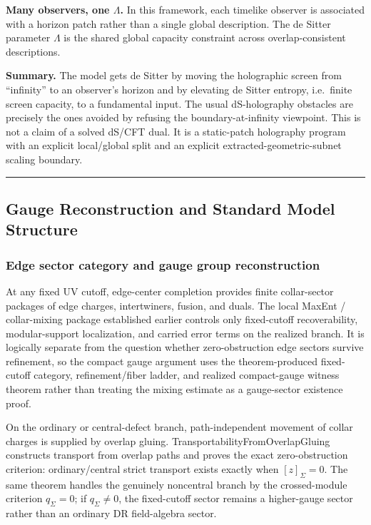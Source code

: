\textbf{Many observers, one \(\Lambda\).} In this framework, each timelike observer is associated with a horizon patch rather than a single global description. The de Sitter parameter \(\Lambda\) is the shared global capacity constraint across overlap-consistent descriptions.

\textbf{Summary.} The model gets de Sitter by moving the holographic screen from ``infinity'' to an observer's horizon and by elevating de Sitter entropy, i.e.\ finite screen capacity, to a fundamental input. The usual dS-holography obstacles are precisely the ones avoided by refusing the boundary-at-infinity viewpoint. This is not a claim of a solved dS/CFT dual. It is a static-patch holography program with an explicit local/global split and an explicit extracted-geometric-subnet scaling boundary.

\begin{center}\rule{0.5\linewidth}{0.5pt}\end{center}
\subsection{Gauge Reconstruction and Standard Model Structure}\label{6-gauge-reconstruction-and-standard-model-structure}

\subsubsection{Edge sector category and gauge group reconstruction}\label{61-edge-sector-category-and-gauge-group-reconstruction}

At any fixed UV cutoff, edge-center completion provides finite collar-sector packages of edge charges, intertwiners, fusion, and duals. The local MaxEnt / collar-mixing package established earlier controls only fixed-cutoff recoverability, modular-support localization, and carried error terms on the realized branch. It is logically separate from the question whether zero-obstruction edge sectors survive refinement, so the compact gauge argument uses the theorem-produced fixed-cutoff category, refinement/fiber ladder, and realized compact-gauge witness theorem rather than treating the mixing estimate as a gauge-sector existence proof.

On the ordinary or central-defect branch, path-independent movement of collar charges is supplied by overlap gluing. TransportabilityFromOverlapGluing constructs transport from overlap paths and proves the exact zero-obstruction criterion: ordinary/central strict transport exists exactly when \([z]_\Sigma=0\). The same theorem handles the genuinely noncentral branch by the crossed-module criterion \(q_\Sigma=0\); if \(q_\Sigma\ne0\), the fixed-cutoff sector remains a higher-gauge sector rather than an ordinary DR field-algebra sector.

